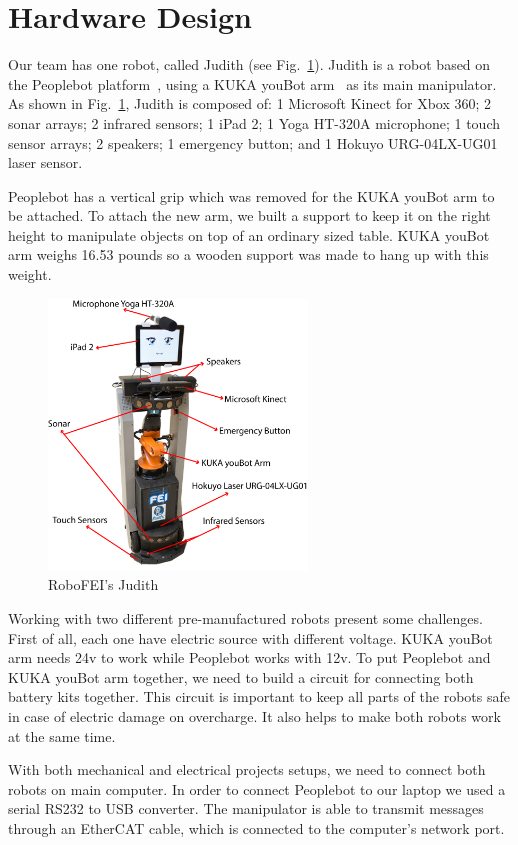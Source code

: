 \section{Hardware Design}

Our team has one robot, called Judith (see Fig.~\ref{fig:judith}). Judith is a robot based on the Peoplebot platform~\cite{peoplebot:2001}, using a KUKA youBot arm~\cite{youbot:2016} as its main manipulator. As shown in Fig.~\ref{fig:judith}, Judith is composed of: 1 Microsoft Kinect for Xbox 360; 2 sonar arrays; 2 infrared sensors; 1 iPad 2; 1 Yoga HT-320A microphone; 1 touch sensor arrays; 2 speakers; 1 emergency button; and 1 Hokuyo URG-04LX-UG01 laser sensor.

Peoplebot has a vertical grip which was removed for the KUKA youBot arm to be attached. To attach the new arm, we built a support to keep it on the right height to manipulate objects on top of an ordinary sized table. KUKA youBot arm weighs 16.53 pounds so a wooden support was made to hang up with this weight.

\begin{figure}[ht!]
    \centering
    \includegraphics[height = 7.2cm]{figures/judith_info.png}
    \caption{RoboFEI's Judith}
    \label{fig:judith}
\end{figure}

Working with two different pre-manufactured robots present some challenges. First of all, each one have electric source with different voltage. KUKA youBot arm needs 24v to work while Peoplebot works with 12v. To put Peoplebot and KUKA youBot arm together, we need to build a circuit for connecting both battery kits together. This circuit is important to keep all parts of the robots safe in case of electric damage on overcharge. It also helps to make both robots work at the same time.

With both mechanical and electrical projects setups, we need to connect both robots on main computer. In order to connect Peoplebot to our laptop we used a serial RS232 to USB converter. The manipulator is able to transmit messages through an EtherCAT cable, which is connected to the computer's network port.

